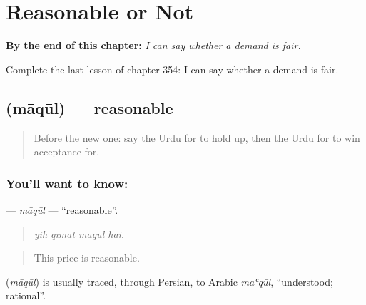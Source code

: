 
\chapter{Reasonable or Not}
\label{ch:ur-reasonable-or-not}

\begin{chapteropening}
\textbf{By the end of this chapter:} \emph{I can say whether a demand is fair.}

Complete the last lesson of chapter 354: I can say whether a demand is fair.
\end{chapteropening}

\section[\texorpdfstring{\ur{معقول} (māqūl)}{معقول (māqūl)}]{ (māqūl) — reasonable}

\label{lesson:UR-C354-maqul}



\begin{quote}
Before the new one: say the Urdu for to hold up, then the Urdu for to win acceptance for.
\end{quote}

\subsection*{You'll want to know: }
\textbf{} — \emph{māqūl} — \textquotedblleft{}reasonable\textquotedblright{}.

\begin{quote}
   
\end{quote}

\begin{quote}
\emph{yih qīmat māqūl hai.}
\end{quote}

\begin{quote}
This price is reasonable.
\end{quote}

\begin{cousinweb}
\textbf{} (\emph{māqūl}) is usually traced, through Persian, to Arabic \emph{maʿqūl}, \textquotedblleft{}understood; rational\textquotedblright{}.
\end{cousinweb}

